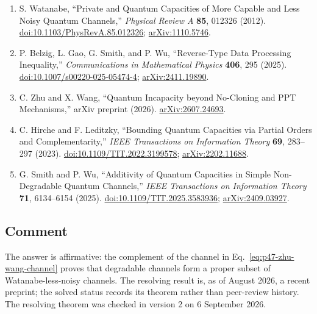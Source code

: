 \begin{enumerate}[label={},leftmargin=4.8em,labelsep=0.5em]
  \footnotesize
  \item[\textup{[Wat12]}]\label{ref:p47-watanabe}
  S. Watanabe, ``Private and Quantum Capacities of More Capable and Less Noisy
  Quantum Channels,'' \emph{Physical Review A} \textbf{85}, 012326 (2012).
  \href{https://doi.org/10.1103/PhysRevA.85.012326}{doi:10.1103/PhysRevA.85.012326};
  \href{https://arxiv.org/abs/1110.5746}{arXiv:1110.5746}.

  \item[\textup{[BGSW25]}]\label{ref:p47-belzig}
  P. Belzig, L. Gao, G. Smith, and P. Wu, ``Reverse-Type Data Processing
  Inequality,'' \emph{Communications in Mathematical Physics} \textbf{406},
  295 (2025).
  \href{https://doi.org/10.1007/s00220-025-05474-4}{doi:10.1007/s00220-025-05474-4};
  \href{https://arxiv.org/abs/2411.19890}{arXiv:2411.19890}.

  \item[\textup{[ZW26]}]\label{ref:p47-zhu-wang}
  C. Zhu and X. Wang, ``Quantum Incapacity beyond No-Cloning and PPT
  Mechanisms,'' arXiv preprint (2026).
  \href{https://arxiv.org/abs/2607.24693}{arXiv:2607.24693}.

  \item[\textup{[HL23]}]\label{ref:p47-hirche-leditzky}
  C. Hirche and F. Leditzky,
  ``Bounding Quantum Capacities via Partial Orders and Complementarity,''
  \emph{IEEE Transactions on Information Theory} \textbf{69}, 283--297
  (2023). \href{https://doi.org/10.1109/TIT.2022.3199578}{doi:10.1109/TIT.2022.3199578};
  \href{https://arxiv.org/abs/2202.11688}{arXiv:2202.11688}.

  \item[\textup{[SW25]}]\label{ref:p47-smith-wu}
  G. Smith and P. Wu,
  ``Additivity of Quantum Capacities in Simple Non-Degradable Quantum
  Channels,'' \emph{IEEE Transactions on Information Theory} \textbf{71},
  6134--6154 (2025).
  \href{https://doi.org/10.1109/TIT.2025.3583936}{doi:10.1109/TIT.2025.3583936};
  \href{https://arxiv.org/abs/2409.03927}{arXiv:2409.03927}.
\end{enumerate}

\subsection*{Comment}

The answer is affirmative: the complement of the channel in
Eq.~\eqref{eq:p47-zhu-wang-channel} proves that degradable channels form a
proper subset of Watanabe-less-noisy channels.  The resolving result
 is, as of August 2026, a recent preprint;
the solved status records its theorem rather than peer-review history. The resolving theorem was checked in version 2 on 6 September 2026.


